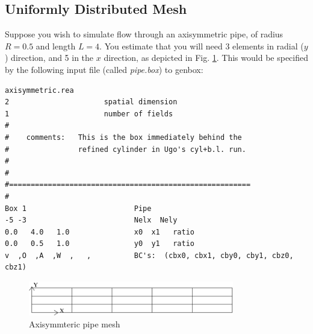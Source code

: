 \subsection{Uniformly Distributed Mesh}

Suppose you wish to simulate flow through an axisymmetric pipe,
of radius \(R=0.5\) and length \(L=4\).  You estimate that you will
need 3 elements in radial (\(y\)) direction, and 5 in the \(x\) direction,
as depicted in Fig. \ref{fig:mesh_axi1}.
This would be specified by the following input file (called {\em pipe.box})
to genbox:

\begin{verbatim}
axisymmetric.rea
2                      spatial dimension
1                      number of fields
#
#    comments:   This is the box immediately behind the 
#                refined cylinder in Ugo's cyl+b.l. run.
#
#
#========================================================
#
Box 1                         Pipe
-5 -3                         Nelx  Nely
0.0   4.0   1.0               x0  x1   ratio
0.0   0.5   1.0               y0  y1   ratio
v  ,O  ,A  ,W  ,   ,          BC's:  (cbx0, cbx1, cby0, cby1, cbz0, cbz1)
\end{verbatim}
\begin{figure}
\centering
\includegraphics[width=0.8\textwidth]{Figs/mesh_axi1}
\caption{Axisymmteric pipe mesh}
\label{fig:mesh_axi1}
\end{figure}
\noindent
